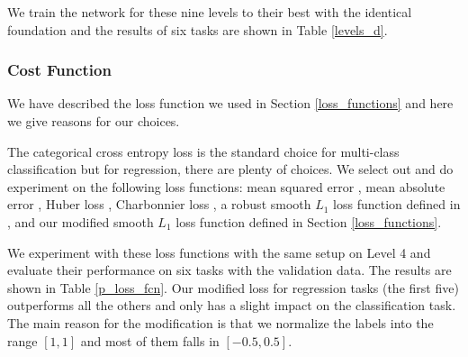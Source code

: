 We train the network for these nine levels to their best with the identical foundation and the results of six tasks are shown in Table \ref{levels_d}. \tbd

\subsubsection{Cost Function}

We have described the loss function we used in Section \ref{loss_functions} and here we give reasons for our choices.

The categorical cross entropy loss is the standard choice for multi-class classification but for regression, there are plenty of choices. We select out and do experiment on the following loss functions:  mean squared error \cite{4775883}, mean absolute error \cite{2005ClRes3079W}, Huber loss \cite{huber1964}, Charbonnier loss \cite{413553},  a robust smooth $L_1$ loss function defined in \cite{DBLP:journals/corr/Girshick15}, and our modified smooth $L_1$ loss function defined in Section \ref{loss_functions}.

We experiment with these loss functions with the same setup on Level 4 and evaluate their performance on six tasks with the validation data. The results are shown in Table \ref{p_loss_fcn}. Our modified loss for regression tasks (the first five) outperforms all the others and only has a slight impact on the classification task. The main reason for the modification is that we normalize the labels into the range $[1, 1]$ and most of them falls in $[-0.5, 0.5]$. 

